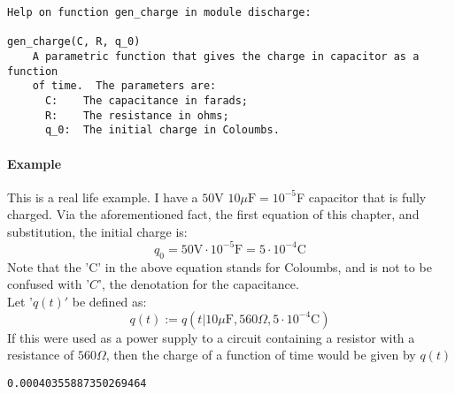 \hypertarget{c14a4ffd}{}
\begin{Shaded}
\begin{Highlighting}[]
\end{Highlighting}
\end{Shaded}

\begin{verbatim}
Help on function gen_charge in module discharge:

gen_charge(C, R, q_0)
    A parametric function that gives the charge in capacitor as a function
    of time.  The parameters are:
      C:    The capacitance in farads;
      R:    The resistance in ohms;
      q_0:  The initial charge in Coloumbs.

\end{verbatim}

\hypertarget{a058ce86}{}
\hypertarget{example}{%
\paragraph{Example}\label{example}}

This is a real life example. I have a \(50\)V \(10\mu\text{F}=10^{-5}\)F
capacitor that is fully charged. Via the aforementioned fact, the first
equation of this chapter, and substitution, the initial charge is:
\[ q_0 = 50 \text{V} \cdot 10^{-5}\text{F}=5 \cdot 10^{-4}\text{C}\]
Note that the 'C' in the above equation stands for Coloumbs, and is not
to be confused with '\(C\)', the denotation for the capacitance.\\
Let '\(q(t)'\) be defined as:
\[ q(t):=q(t \vert 10\mu \text{F}, 560\Omega, 5 \cdot 10^{-4}\text{C})\]
If this were used as a power supply to a circuit containing a resistor
with a resistance of \(560\Omega\), then the charge of a function of
time would be given by \(q(t)\)

\hypertarget{f72d140f}{}
\begin{Shaded}
\begin{Highlighting}[]
\OperatorTok{=}\NormalTok{, }\NormalTok{, }\NormalTok{)}
\NormalTok{)}
\end{Highlighting}
\end{Shaded}

\begin{verbatim}
0.00040355887350269464
\end{verbatim}

